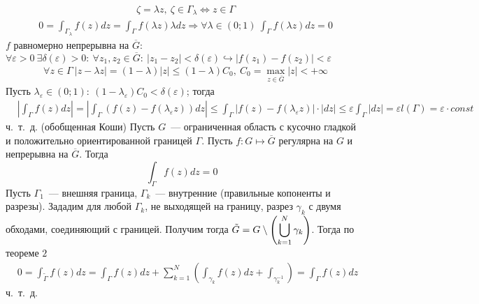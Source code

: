 \begin{align*}
  & \zeta = \lambda z, \ \zeta \in \Gamma_{\lambda} \Leftrightarrow z \in \Gamma
\end{align*}
\begin{align*}
  & 0 = \int_{\Gamma_\lambda}f(z)dz = \int_{\Gamma}f(\lambda z)\lambda dz \Rightarrow \forall \lambda \in (0;1) \ \int_{\Gamma}f(\lambda z)dz = 0
\end{align*}
$f$ равномерно непрерывна на $\overline{G}$: $\forall \varepsilon > 0 \ \exists
\delta(\varepsilon) >0: \ \forall z_1, z_2 \in \overline{G}: \ \left| z_1-z_2
\right| < \delta(\varepsilon) \hookrightarrow \left| f(z_1) - f(z_2) \right| < \varepsilon$
\begin{align*}
  & \forall z \in \Gamma \ \left| z-\lambda z \right| = (1-\lambda) \left| z \right| \leq (1-\lambda)C_0, \ C_0 = \max_{z \in \overline{G}}\left| z \right| < +\infty
\end{align*}
Пусть $\lambda_{\varepsilon}\in(0;1): \ (1 -
\lambda_{\varepsilon})C_0<\delta(\varepsilon)$; тогда
\begin{align*}
  & \left| \int_{\Gamma}f(z)dz \right|= \left| \int_{\Gamma}\left( f(z)-f(\lambda_{\varepsilon}z) \right)dz \right|\leq \int_{\Gamma} \left| f(z) - f(\lambda_{\varepsilon}z) \right| \cdot \left| dz \right| \leq \varepsilon \int_{\Gamma} \left| dz \right| = \varepsilon l(\Gamma) = \varepsilon \cdot const
\end{align*}
ч.~т.~д.
\theorem (обобщенная Коши) Пусть $G$~--- ограниченная область с кусочно гладкой
и положительно ориентированной границей $\Gamma$. Пусть $f: G \mapsto
\overline{G}$ регулярна на $G$ и непрерывна на $\overline{G}$. Тогда
\begin{equation} \label{(7.5)}
  \int_{\Gamma}f(z)dz = 0
\end{equation}
\pr
Пусть $\Gamma_1$~--- внешняя граница, $\Gamma_k$~--- внутренние (правильные
копоненты и разрезы). Зададим для любой $\Gamma_k$, не выходящей на границу,
разрез $\gamma_k$ с двумя обходами, соединяющий с границей. Получим тогда
$\tilde{G} = G \setminus \left(\displaystyle \bigcup_{k=1}^N \gamma_k \right)$. Тогда по
теореме $2$
\begin{align*}
  & 0 = \int_{\tilde{\Gamma}}f(z)dz = \int_{\Gamma} f(z)dz + \sum_{k=1}^N\left( \int_{\gamma_k} f(z) dz + \int_{\gamma_k^{-1}} \right) = \int_{\Gamma} f(z) dz
\end{align*}
ч.~т.~д.
\\
